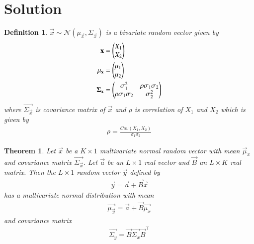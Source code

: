 \documentclass[journal,12pt,twocolumn]{IEEEtran}
\newtheorem{theorem}{Theorem}[section]
\newtheorem{definition}{Definition}[section]
\begin{document}
\section*{Solution}
\begin{definition}
    $\vec{x}\sim\mathcal{N}(\mu_{\vec{x}},\Sigma_{\vec{x}})$ is a bivariate random vector given by
    \begin{align}
        \mathbf{x}&=\begin{pmatrix}X_1\\
                       X_2\end{pmatrix}\\
        \mathbf{\mu_{\mathbf{x}}}&=\begin{pmatrix}\mu_1\\
                                    \mu_2\end{pmatrix}\\
        \mathbf{\Sigma_{\mathbf{x}}}&=\begin{pmatrix}\sigma_1^2&\rho\sigma_1\sigma_2\\
                                        \rho\sigma_1\sigma_2&\sigma_2^2\end{pmatrix}
    \end{align}
    where $\vec{\Sigma_{\vec{x}}}$ is covariance matrix of $\vec{x}$ and $\rho$ is correlation of $X_1$ and $X_2$ which is given by
    \begin{align}
        \rho=\frac{Cov(X_1,X_2)}{\sigma_1\sigma_2}
    \end{align}
\end{definition}
\begin{theorem}
     Let $\vec{x}$ be a $K\times1$ multivariate normal random vector with mean $\vec{\mu}_x$ and covariance matrix $\vec{\Sigma_{\vec{x}}}$. Let $\vec{a}$ be an $L\times1$ real vector and $\vec{B}$ an $L\times K$ real matrix. Then the $L\times1$ random vector $\vec{y}$ defined by
     \begin{align}
         \vec{y}=\vec{a}+\vec{B}\vec{x}
     \end{align}
     has a multivariate normal distribution with mean
     \begin{align}
         \vec{\mu_\vec{y}}=\vec{a}+\vec{B}\vec{\mu_x}
     \end{align}
     and covariance matrix
     \begin{align}
         \vec{\Sigma_y}=\vec{B}\vec{\Sigma_x}\vec{B}^{\top}
     \end{align}
\end{theorem}
\end{document}

